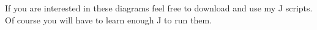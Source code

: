 
If you are interested in these diagrams feel free to download and use my
J scripts. Of course you will have to learn enough J to run them.



%